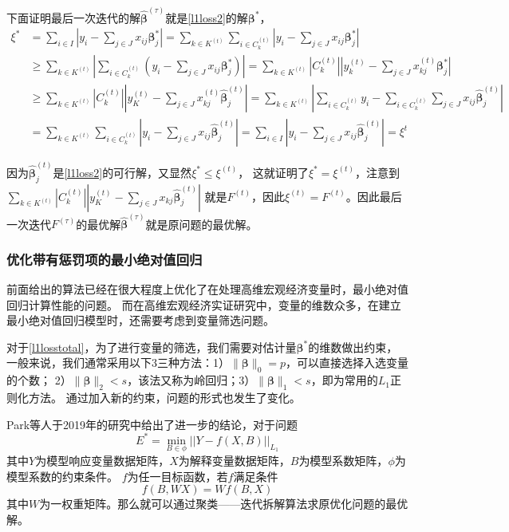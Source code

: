 下面证明最后一次迭代的解$\hat{\bm{\beta}}^{(\tau)}$就是\eqref{l1loss2}的解$\bm{\beta}^*$，
\begin{equation*}
    \begin{split}
        \xi^* & = \sum_{i \in I} |y_i - \sum_{j \in J}x_{ij}\bm{\beta}_j^*|
        = \sum_{k \in K^{(t)}}\sum_{i \in C_k^{(t)}}|y_i - \sum_{j \in J}x_{ij}\bm{\beta}_j^*| \\
        & \geq \sum_{k \in K^{(t)}}|\sum_{i\in C_k^{(t)}}(y_i - \sum_{j \in J}x_{ij}\bm{\beta}_j^*)|
        = \sum_{k \in K^{(t)}}|C_k^{(t)}||y_k^{(t)} - \sum_{j \in J}x_{kj}^{(t)}\bm{\beta}_j^*|\\
        & \geq \sum_{k \in K^{(t)}} |C_k^{(t)}||y_K^{(t)} - \sum_{j\in J}x_{kj}^{(t)} \hat{\bm{\beta}}_j^{(t)}|
        = \sum_{k \in K^{(t)}} |\sum_{i \in C_k^{(t)}} y_i - \sum_{i \in C_k^{(t)}}\sum_{j \in J}x_{ij}\hat{\bm{\beta}}_j^{(t)}| \\
        & = \sum_{k \in K^{(t)}} \sum_{i \in C_k^{(t)}}|y_i - \sum_{j \in J}x_{ij}\hat{\bm{\beta}}_j^{(t)}|
        = \sum_{i \in I}|y_i - \sum_{j \in J} x_{ij} \hat{\bm{\beta}}_j^{(t)}| 
        = \xi^t
    \end{split}
\end{equation*}

因为$\hat{\bm{\beta}}_j^{(t)}$是\eqref{l1loss2}的可行解，又显然$\xi^* \leq \xi^{(t)}$，
这就证明了$\xi^* = \xi^{(t)}$，注意到$ \sum_{k \in K^{(t)}} |C_k^{(t)}||y_K^{(t)} - \sum_{j\in J}x_{kj} \hat{\bm{\beta}}_j^{(t)}|$
就是$F^{(t)}$，因此$\xi^{(t)} = F^{(t)}$。因此最后一次迭代$F^{(\tau)}$的最优解$\hat{\bm{\beta}}^{(\tau)}$就是原问题的最优解。

\subsubsection{优化带有惩罚项的最小绝对值回归}
前面给出的算法已经在很大程度上优化了在处理高维宏观经济变量时，最小绝对值回归计算性能的问题。
而在高维宏观经济实证研究中，变量的维数众多，在建立最小绝对值回归模型时，还需要考虑到变量筛选问题。

对于\eqref{l1losstotal}，为了进行变量的筛选，我们需要对估计量$\bm{\beta}^*$的维数做出约束，
一般来说，我们通常采用以下3三种方法：1）$\|\bm{\beta}\|_0 = p$，可以直接选择入选变量的个数；
2）$\|\bm{\beta}\|_2 < s$，该法又称为岭回归；3）$\|\bm{\beta}\|_1 < s$，即为常用的$L_1$正则化方法。
通过加入新的约束，问题的形式也发生了变化。

Park等人于2019年的研究中给出了进一步的结论，对于问题
\begin{equation}\label{l1conclusion}
    E^* = \underset{B\in \phi}{\operatorname{min}} ||Y - f(X, B)||_{L_1}
\end{equation}
其中$Y$为模型响应变量数据矩阵，$X$为解释变量数据矩阵，$B$为模型系数矩阵，$\phi$为模型系数的约束条件。
$f$为任一目标函数，若$f$满足条件
\begin{equation}\label{fcondition}
    f(B, WX) = Wf(B, X)
\end{equation}
其中$W$为一权重矩阵。那么就可以通过聚类——迭代拆解算法求原优化问题的最优解。

